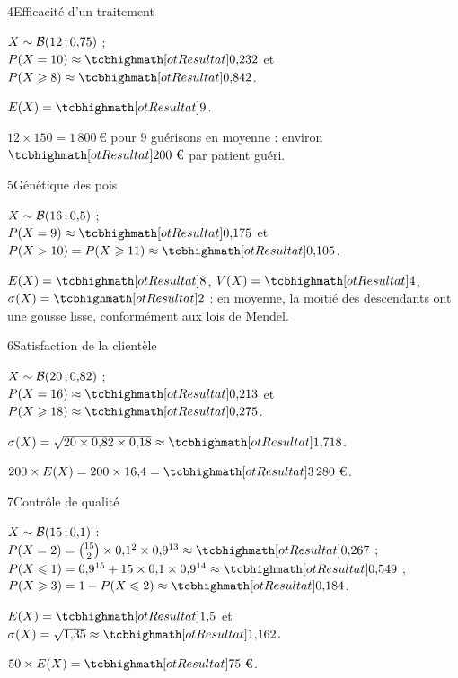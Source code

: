 \begin{deuxcolonnes}
\begin{corrige}{4}{Efficacité d'un traitement}
\begin{questions}
  \item $X\sim\mathcal{B}(12\,{;}\,0{,}75)$ ;\\ $P(X=10)\approx\res{0{,}232}$ et\\ $P(X\geq8)\approx\res{0{,}842}$.
  \item $E(X)=\res{9}$.
  \item $12\times150=1\,800$\,€ pour $9$ guérisons en moyenne : environ $\res{200\text{ €}}$ par patient guéri.
\end{questions}
\end{corrige}

\begin{corrige}{5}{Génétique des pois}
\begin{questions}
  \item $X\sim\mathcal{B}(16\,{;}\,0{,}5)$ ;\\ $P(X=9)\approx\res{0{,}175}$ et\\ $P(X>10)=P(X\geq11)\approx\res{0{,}105}$.
  \item $E(X)=\res{8}$, $V(X)=\res{4}$, $\sigma(X)=\res{2}$ : en moyenne, la moitié des descendants ont une gousse lisse,
    conformément aux lois de Mendel.
\end{questions}
\end{corrige}

\begin{corrige}{6}{Satisfaction de la clientèle}
\begin{questions}
  \item $X\sim\mathcal{B}(20\,{;}\,0{,}82)$ ;\\ $P(X=16)\approx\res{0{,}213}$ et\\ $P(X\geq18)\approx\res{0{,}275}$.
  \item $\sigma(X)=\sqrt{20\times0{,}82\times0{,}18}\approx\res{1{,}718}$.
  \item $200\times E(X)=200\times16{,}4=\res{3\,280\text{ €}}$.
\end{questions}
\end{corrige}

\end{deuxcolonnes}

\begin{corrige}{7}{Contrôle de qualité}
\begin{questions}
  \item $X\sim\mathcal{B}(15\,{;}\,0{,}1)$ : $P(X=2)=\binom{15}2\times0{,}1^{2}\times0{,}9^{13}\approx\res{0{,}267}$ ; $P(X\leq1)=0{,}9^{15}+15\times0{,}1\times0{,}9^{14}\approx\res{0{,}549}$ ;
    $P(X\geq3)=1-P(X\leq2)\approx\res{0{,}184}$.
  \item $E(X)=\res{1{,}5}$ et $\sigma(X)=\sqrt{1{,}35}\approx\res{1{,}162}$.
  \item $50\times E(X)=\res{75\text{ €}}$.
\end{questions}
\end{corrige}

